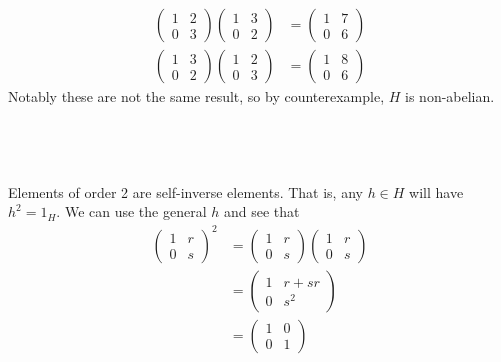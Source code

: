 \documentclass[a4paper]{article}
\begin{document}
\begin{align*}
\begin{pmatrix} 1 & 2 \\ 0 & 3 \end{pmatrix} \begin{pmatrix} 1 & 3 \\ 0 & 2 \end{pmatrix} &= \begin{pmatrix} 1 & 7 \\ 0 & 6 \end{pmatrix} \\[1ex]
\begin{pmatrix} 1 & 3 \\ 0 & 2 \end{pmatrix} \begin{pmatrix} 1 & 2 \\ 0 & 3 \end{pmatrix} &= \begin{pmatrix} 1 & 8 \\ 0 & 6 \end{pmatrix}
\end{align*}
Notably these are not the same result, so by counterexample, $H$ is non-abelian.

\subsection{~} %

Elements of order 2 are self-inverse elements. That is, any $h \in H$ will have $h^2 = 1_H$. We can use the general $h$ and see that \begin{align*}
\begin{pmatrix} 1 & r \\ 0 & s \end{pmatrix}^2 &= \begin{pmatrix} 1 & r \\ 0 & s \end{pmatrix} \begin{pmatrix} 1 & r \\ 0 & s \end{pmatrix} \\[1ex]
&= \begin{pmatrix} 1 & r + sr \\ 0 & s^2 \end{pmatrix} \\[1ex]
&= \begin{pmatrix} 1 & 0 \\ 0 & 1 \end{pmatrix}
\end{align*}
\end{document}
